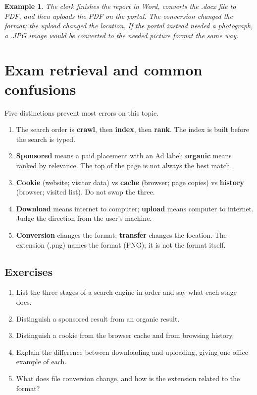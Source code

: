 \documentclass[11pt]{article}
\newtheorem{example}{Example}[section]
\begin{document}
\begin{example}
The clerk finishes the report in Word, converts the .docx file to PDF, and
then uploads the PDF on the portal. The conversion changed the format; the
upload changed the location. If the portal instead needed a photograph, a
.JPG image would be converted to the needed picture format the same way.
\end{example}

\section{Exam retrieval and common confusions}
Five distinctions prevent most errors on this topic.
\begin{enumerate}
  \item The search order is \textbf{crawl}, then \textbf{index}, then
    \textbf{rank}. The index is built before the search is typed.
  \item \textbf{Sponsored} means a paid placement with an Ad label;
    \textbf{organic} means ranked by relevance. The top of the page is not
    always the best match.
  \item \textbf{Cookie} (website; visitor data) vs \textbf{cache} (browser;
    page copies) vs \textbf{history} (browser; visited list). Do not swap
    the three.
  \item \textbf{Download} means internet to computer; \textbf{upload} means
    computer to internet. Judge the direction from the user's machine.
  \item \textbf{Conversion} changes the format; \textbf{transfer} changes
    the location. The extension (.png) names the format (PNG); it is not
    the format itself.
\end{enumerate}

\subsection*{Exercises}
\begin{enumerate}[label=\arabic*.]
  \item List the three stages of a search engine in order and say what each stage does.
  \item Distinguish a sponsored result from an organic result.
  \item Distinguish a cookie from the browser cache and from browsing history.
  \item Explain the difference between downloading and uploading, giving one office example of each.
  \item What does file conversion change, and how is the extension related to the format?
\end{enumerate}
\end{document}
